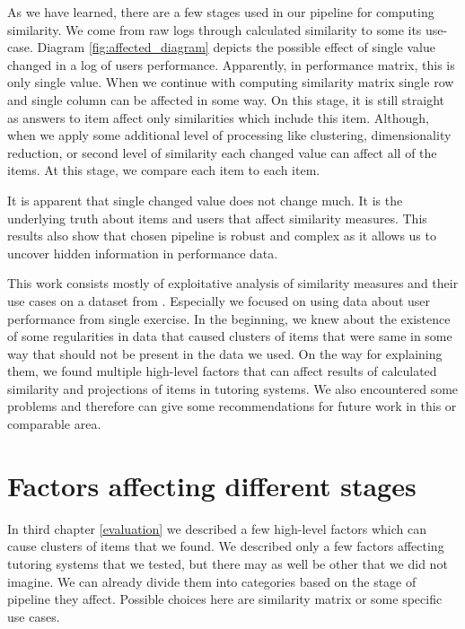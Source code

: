 \documentclass[
  digital, %
  table,   %
  nolof,     %
  nolot,     %
  nocover,
  color,
  final, %
]{fithesis3}
\begin{document}
As we have learned, there are a few stages used in our pipeline for computing similarity. We come from raw logs through calculated similarity to some its use-case. Diagram \ref{fig:affected_diagram} depicts the possible effect of single value changed in a log of users performance. Apparently, in performance matrix, this is only single value. When we continue with computing similarity matrix single row and single column can be affected in some way. On this stage, it is still straight as answers to item affect only similarities which include this item. Although, when we apply some additional level of processing like clustering, dimensionality reduction, or second level of similarity each changed value can affect all of the items. At this stage, we compare each item to each item.

It is apparent that single changed value does not change much. It is the underlying truth about items and users that affect similarity measures. This results also show that chosen pipeline is robust and complex as it allows us to uncover hidden information in performance data.

This work consists mostly of exploitative analysis of similarity measures and their use cases on a dataset from \umimeCesky{}. Especially we focused on using data about user performance from single exercise. In the beginning, we knew about the existence of some regularities in data that caused clusters of items that were same in some way that should not be present in the data we used. On the way for explaining them, we found multiple high-level factors that can affect results of calculated similarity and projections of items in tutoring systems. We also encountered some problems and therefore can give some recommendations for future work in this or comparable area.


\section{Factors affecting different stages}\label{factors-affecting-different-stages}

In third chapter \ref{evaluation} we described a few high-level factors which can cause clusters of items that we found. We described only a few factors affecting tutoring systems that we tested, but there may as well be other that we did not imagine. We can already divide them into categories based on the stage of pipeline they affect. Possible choices here are similarity matrix or some specific use cases.
\end{document}
